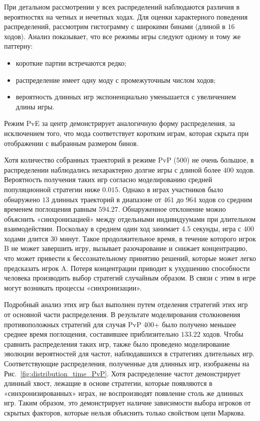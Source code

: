 При детальном рассмотрении у всех распределений наблюдаются различия в вероятностях на четных и нечетных ходах. 
Для оценки характерного поведения распределений, рассмотрим гистограмму с широкими бинами (длиной в $16$ ходов). 
Анализ показывает, что все режимы игры следуют одному и тому же паттерну:
\begin{itemize}
\item короткие партии встречаются редко;
\item распределение имеет одну моду с промежуточным числом ходов;
\item вероятность длинных игр экспоненциально уменьшается с увеличением длины игры.
\end{itemize}

Режим PvE за центр демонстрирует аналогичную форму распределения, за исключением того, что мода соответствует коротким играм, 
которая скрыта при отображении с выбранным размером бинов.

Хотя количество собранных траекторий в режиме PvP ($500$) не очень большое, в распределении наблюдались нехарактерно долгие игры с длиной более $400$ ходов. 
Вероятность получения таких игр согласно моделированию средней популяционной стратегии ниже $0.015$. 
Однако в играх участников было обнаружено $13$ длинных траекторий в диапазоне от $461$ до $964$ ходов со средним временем поглощения равным $594.27$. 
Обнаруженное отклонение можно объяснить «синхронизацией» между отдельными индивидуумами при длительном взаимодействии. 
Поскольку в среднем один ход занимает $4.5$ секунды, игра с $400$ ходами длится $30$ минут. 
Такое продолжительное время, в течение которого игрок B не может завершить игру, вызывает разочарование и снижает концентрацию, 
что может привести к бессознательному принятию решений, которые может легко предсказать игрок A. 
Потеря концентрации приводит к ухудшению способности человека производить выбор стратегий случайным образом. 
В связи с этим в игре могут возникать процессы «синхронизации».

Подробный анализ этих игр был выполнен путем отделения стратегий этих игр от основной части распределения. 
В результате моделирования столкновения противоположных стратегий для случая PvP 400+ было получено меньшее среднее время поглощения, составившее приблизительно $133.22$ ходов. 
Чтобы сравнить распределения таких игр, также было проведено моделирование эволюции вероятностей для частот, наблюдавшихся в стратегиях длительных игр. 
Соответствующие распределения, полученные для длинных игр, изображены на Рис.~\cref{fig:distribution_time_PvP}. Хотя распределение частот демонстрирует длинный хвост, 
лежащие в основе стратегии, которые появляются в «синхронизированных» играх, не воспроизводят появление столь же длинных игр. 
Таким образом, это демонстрирует наличие зависимости выбора игроков от скрытых факторов, которые нельзя объяснить только свойством цепи Маркова.



